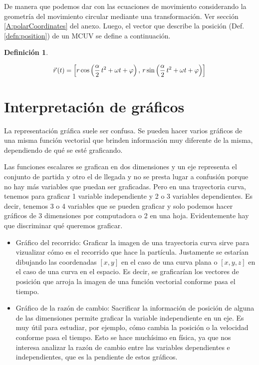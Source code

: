 \documentclass[a5paper,12pt,twoside]{book}
\newtheorem{defn}{{Definición}}[chapter]
\begin{document}
De manera que podemos dar con las ecuaciones de movimiento considerando la geometría del movimiento circular mediante una transformación. Ver sección \ref{A:polarCoordinates} del anexo. Luego, el vector que describe la posición (Def. \ref{defn:position}) de un MCUV se define a continuación.

\begin{mdframed}[style=MyFrame1]
    \begin{defn}
    \end{defn}
    \begin{equation*}
        \scale{0.94}{
        \xyz(t) = \sqb{r \cos{\left(\frac{\alpha}{2} \, t^2 + \omega t + \varphi\right)} \, , \, r \sin{\left(\frac{\alpha}{2} \, t^2 + \omega t + \varphi\right)}}
        }
    \end{equation*}
\end{mdframed}


\section{Interpretación de gráficos}

La representación gráfica suele ser confusa. Se pueden hacer varios gráficos de una misma función vectorial que brinden información muy diferente de la misma, dependiendo de qué se esté graficando.

Las funciones escalares se grafican en dos dimensiones y un eje representa el conjunto de partida y otro el de llegada y no se presta lugar a confusión porque no hay más variables que puedan ser graficadas. Pero en una trayectoria curva, tenemos para graficar 1 variable independiente y 2 o 3 variables dependientes. Es decir, tenemos 3 o 4 variables que se pueden graficar y solo podemos hacer gráficos de 3 dimensiones por computadora o 2 en una hoja. Evidentemente hay que discriminar qué queremos graficar.

\begin{itemize}
    \item Gráfico del recorrido: Graficar la imagen de una trayectoria curva sirve para vizualizar cómo es el recorrido que hace la partícula. Justamente se estarían dibujando las coordenadas $[x,y]$ en el caso de una curva plana o $[x,y,z]$ en el caso de una curva en el espacio. Es decir, se graficarían los vectores de posición que arroja la imagen de una función vectorial conforme pasa el tiempo.
    
    \item Gráfico de la razón de cambio: Sacrificar la información de posición de alguna de las dimensiones permite graficar la variable independiente en un eje. Es muy útil para estudiar, por ejemplo, cómo cambia la posición o la velocidad conforme pasa el tiempo. Esto se hace muchísimo en física, ya que nos interesa analizar la razón de cambio entre las variables dependientes e independientes, que es la pendiente de estos gráficos.
\end{itemize}
\end{document}
